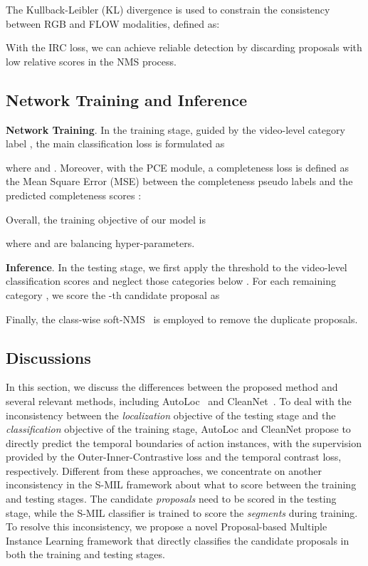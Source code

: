 The Kullback-Leibler (KL) divergence is used to constrain the consistency between RGB and FLOW modalities, defined as:


With the IRC loss, we can achieve reliable detection by discarding proposals with low relative scores in the NMS process.




\subsection{Network Training and Inference}
\label{sec:network}
{\bf Network Training}.
In the training stage, guided by the video-level category label , the main classification loss is formulated as

where  and .
Moreover, with the PCE module, a completeness loss is defined as the Mean Square Error (MSE) between the completeness pseudo labels  and the predicted completeness scores :

Overall, the training objective of our model is

where  and  are balancing hyper-parameters.


{\bf Inference}.
In the testing stage, we first apply the threshold  to the video-level classification scores  and neglect those categories below .
For each remaining category , we score the -th candidate proposal as

Finally, the class-wise soft-NMS~\cite{iccv2017softnms} is employed to remove the duplicate proposals.




\subsection{Discussions}
\label{sec:discussion}
In this section, we discuss the differences between the proposed method and several relevant methods, including AutoLoc~\cite{eccv2018autoloc} and CleanNet~\cite{iccv2019cleannet}.
To deal with the inconsistency between the \emph{localization} objective of the testing stage and the \emph{classification} objective of the training stage,
AutoLoc and CleanNet propose to directly predict the temporal boundaries of action instances, 
with the supervision provided by the Outer-Inner-Contrastive loss and the temporal contrast loss, respectively.
Different from these approaches,
we concentrate on another inconsistency in the S-MIL framework
about what to score between the training and testing stages.
The candidate \emph{proposals} need to be scored in the testing stage,
while the S-MIL classifier is trained to score the \emph{segments} during training.
To resolve this inconsistency,
we propose a novel Proposal-based Multiple Instance Learning framework
that directly classifies the candidate proposals in both the training and testing stages.


